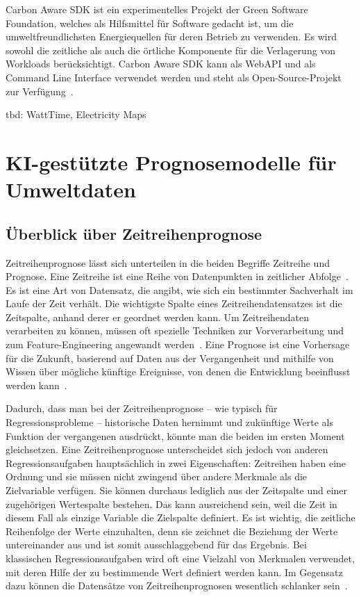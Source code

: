 Carbon Aware SDK ist ein experimentelles Projekt der Green Software Foundation, welches als Hilfsmittel für Software gedacht ist, um die umweltfreundlichsten Energiequellen für deren Betrieb zu verwenden.
Es wird sowohl die zeitliche als auch die örtliche Komponente für die Verlagerung von Workloads berücksichtigt.
Carbon Aware SDK kann als WebAPI und als Command Line Interface verwendet werden und steht als Open-Source-Projekt zur Verfügung~\cite{GreenSoftwareFoundation.20231212T09:58:27.000Z}.

tbd: WattTime, Electricity Maps

\section{KI-gestützte Prognosemodelle für Umweltdaten}
\subsection{Überblick über Zeitreihenprognose}
Zeitreihenprognose lässt sich unterteilen in die beiden Begriffe Zeitreihe und Prognose.
Eine Zeitreihe ist eine Reihe von Datenpunkten in zeitlicher Abfolge~\cite{Peixeiro.2022}.
Es ist eine Art von Datensatz, die angibt, wie sich ein bestimmter Sachverhalt im Laufe der Zeit verhält.
Die wichtigste Spalte eines Zeitreihendatensatzes ist die Zeitspalte, anhand derer er geordnet werden kann.
Um Zeitreihendaten verarbeiten zu können, müssen oft spezielle Techniken zur Vorverarbeitung und zum Feature-Engineering angewandt werden~\cite{Lazzeri.2021}.
Eine Prognose ist eine Vorhersage für die Zukunft, basierend auf Daten aus der Vergangenheit und mithilfe von Wissen über mögliche künftige Ereignisse, von denen die Entwicklung beeinflusst werden kann~\cite{Peixeiro.2022}.

Dadurch, dass man bei der Zeitreihenprognose -- wie typisch für Regressionsprobleme -- historische Daten hernimmt und zukünftige Werte als Funktion der vergangenen ausdrückt, könnte man die beiden im ersten Moment gleichsetzen.
Eine Zeitreihenprognose unterscheidet sich jedoch von anderen Regressionsaufgaben hauptsächlich in zwei Eigenschaften:
Zeitreihen haben eine Ordnung und sie müssen nicht zwingend über andere Merkmale als die Zielvariable verfügen.
Sie können durchaus lediglich aus der Zeitspalte und einer zugehörigen Wertespalte bestehen.
Das kann ausreichend sein, weil die Zeit in diesem Fall als einzige Variable die Zielspalte definiert.
Es ist wichtig, die zeitliche Reihenfolge der Werte einzuhalten, denn sie zeichnet die Beziehung der Werte untereinander aus und ist somit ausschlaggebend für das Ergebnis.
Bei klassischen Regressionsaufgaben wird oft eine Vielzahl von Merkmalen verwendet, mit deren Hilfe der zu bestimmende Wert definiert werden kann.
Im Gegensatz dazu können die Datensätze von Zeitreihenprognosen wesentlich schlanker sein~\cite{Peixeiro.2022}.

